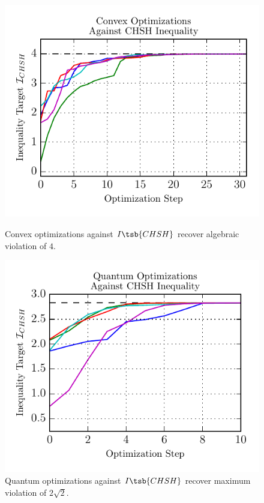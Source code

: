 \documentclass[aps, 10pt, english, twoside, pra, nofootinbib, longbibliography]{revtex4-1}
\begin{document}
    \begin{figure}
    \newlength\figureheight
    \newlength\figurewidth
    \setlength\figureheight{2.7in}
    \setlength{}
    \begin{center}
        \begin{minipage}[b]{.48\textwidth}
            \centering
            \includegraphics{../../figures/CHSH_convex.pdf}
            \caption{Convex optimizations against $I\tsb{CHSH}$ recover algebraic violation of $4$.}
            \label{fig:CHSH_convex}
        \end{minipage}\hspace{0.04\textwidth}%
        \begin{minipage}[b]{.48\textwidth}
            \centering
            \includegraphics{../../figures/CHSH_quantum.pdf}
            \caption{Quantum optimizations against $I\tsb{CHSH}$ recover maximum violation of $2\sqrt{2}$.}
            \label{fig:CHSH_quantum}
        \end{minipage}
    \end{center}
    \end{figure}
\end{document}
